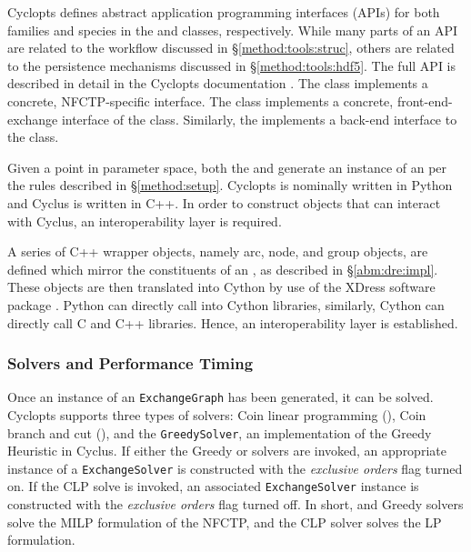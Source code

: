 Cyclopts defines abstract application programming interfaces (APIs) for both
families and species in the  and 
classes, respectively. While many parts of an API are related to the workflow
discussed in \S \ref{method:tools:struc}, others are related to the persistence
mechanisms discussed in \S \ref{method:tools:hdf5}. The full API is described in
detail in the Cyclopts documentation \cite{cyclopts}. The 
class implements a concrete, NFCTP-specific  interface. The
 class implements a concrete, front-end-exchange
interface of the  class. Similarly, the
 implements a back-end interface to the class.

Given a point in parameter space, both the  and
 generate an instance of an  per the
rules described in \S \ref{method:setup}. Cyclopts is nominally written in
Python and Cyclus is written in C++. In order to construct objects that can
interact with Cyclus, an interoperability layer is required. 

A series of C++ wrapper objects, namely arc, node, and group objects, are
defined which mirror the constituents of an , as described
in \S \ref{abm:dre:impl}. These objects are then translated into Cython
\cite{behnel2010cython} by use of the XDress software package
\cite{xdress}. Python can directly call into Cython libraries, similarly, Cython
can directly call C and C++ libraries. Hence, an interoperability layer is
established.

\subsubsection{Solvers and Performance Timing}

Once an instance of an \texttt{ExchangeGraph} has been generated, it can be
solved. Cyclopts supports three types of solvers: Coin linear programming
(\clp), Coin branch and cut (\cbc), and the \texttt{GreedySolver}, an
implementation of the Greedy Heuristic in Cyclus. If either the Greedy or \cbc
solvers are invoked, an appropriate instance of a \texttt{ExchangeSolver} is
constructed with the \textit{exclusive orders} flag turned on. If the CLP solve
is invoked, an associated \texttt{ExchangeSolver} instance is constructed with
the \textit{exclusive orders} flag turned off. In short, \cbc and Greedy solvers
solve the MILP formulation of the NFCTP, and the CLP solver solves the LP
formulation.

